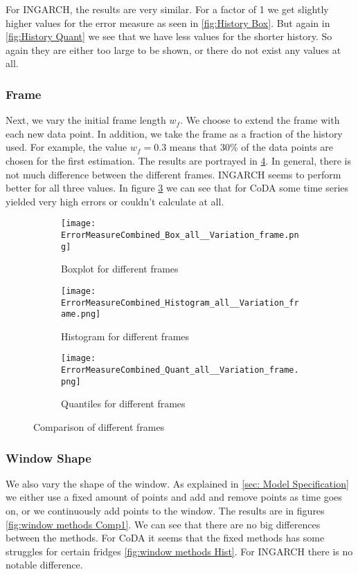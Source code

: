 For INGARCH, the results are very similar. For a factor of 1 we get slightly higher values for the error measure as seen in \ref{fig:History Box}. But again in \ref{fig:History Quant} we see that we have less values for the shorter history. So again they are either too large to be shown, or there do not exist any values at all. 

\subsubsection{Frame}
\label{sec:Frame}

Next, we vary the initial frame length $w_f$. We choose to extend the frame with each new data point. In addition, we take the frame as a fraction of the history used. For example, the value $w_f=0.3$ means that 30\% of the data points are chosen for the first estimation. The results are portrayed in \ref{fig:Frame Comp1}. In general, there is not much difference between the different frames. INGARCH seems to perform better for all three values. In figure \ref{fig:Frame Quant} we can see that for CoDA some time series yielded very high errors or couldn't calculate at all. 
\begin{figure}[htb!]
\centering
\begin{subfigure}[b]{0.45\textwidth}
\texttt{[image: ErrorMeasureCombined\_Box\_all\_\_Variation\_frame.png]}
\caption{Boxplot for different frames}
\label{fig:Frame Box}
\end{subfigure}
\hfill
\begin{subfigure}[b]{0.45\textwidth}
\texttt{[image: ErrorMeasureCombined\_Histogram\_all\_\_Variation\_frame.png]}
\caption{Histogram for different frames}
\label{fig:Frame Hist}
\end{subfigure}
\hfill
\begin{subfigure}[b]{0.8\textwidth}
\texttt{[image: ErrorMeasureCombined\_Quant\_all\_\_Variation\_frame.png]}
\caption{Quantiles for different frames}
\label{fig:Frame Quant}
\end{subfigure}
\caption{Comparison of different frames}
\label{fig:Frame Comp1}
\end{figure}



\subsubsection{Window Shape}
\label{sec:Window Shape}

We also vary the shape of the window. As explained in \ref{sec: Model Specification} we either use a fixed amount of points and add and remove points as time goes on, or we continuously add points to the window. The results are in figures \ref{fig:window methods Comp1}. We can see that there are no big differences between the methods. For CoDA it seems that the fixed methods has some struggles for certain fridges \ref{fig:window methods Hist}. For INGARCH there is no notable difference. 

